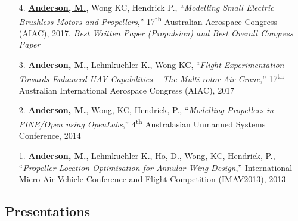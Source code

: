 \documentclass[12pt,letter,sans]{moderncv}        %
\begin{document}
\begin{itemize}
    \item [4.] \underline{\textbf{Anderson, M.}}, Wong KC, Hendrick P., ``\textit{Modelling Small Electric Brushless Motors and Propellers},'' 17\textsuperscript{th} Australian Aerospace Congress (AIAC), 2017. \textit{Best Written Paper (Propulsion) and Best Overall Congress Paper}
    
    \item [3.] \underline{\textbf{Anderson, M.}}, Lehmkuehler K., Wong KC, ``\textit{Flight Experimentation Towards Enhanced UAV Capabilities -- The Multi-rotor Air-Crane},'' 17\textsuperscript{th} Australian International Aerospace Congress (AIAC), 2017
    
    \item [2.] \underline{\textbf{Anderson, M.}}, Wong, KC, Hendrick, P., ``\textit{Modelling Propellers in FINE/Open using OpenLabs},'' 4\textsuperscript{th} Australasian Unmanned Systems Conference, 2014
    
    \item [1.] \underline{\textbf{Anderson, M.}}, Lehmkuehler K., Ho, D., Wong, KC, Hendrick, P., ``\textit{Propeller Location Optimisation for Annular Wing Design},'' International Micro Air Vehicle Conference and Flight Competition (IMAV2013), 2013
    
\end{itemize}



    
    


\subsection{Presentations}
\end{document}

